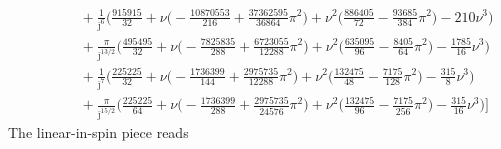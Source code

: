 \documentclass[prd,superscriptaddress,preprintnumbers,tightenlines,nofootinbib, eqsecnum]{revtex4-2}
\newcommand{\nn}{\nonumber}
\begin{document}
\begin{align}
&\qquad\quad + \frac{1}{\bar{\jmath}^{6}}\Bigg(\frac{915915}{32} + \nu\bigg(-\frac{10870553}{216} + \frac{37362595}{36864}\pi^{2}\bigg) + \nu^{2}\bigg(\frac{886405}{72} - \frac{93685}{384}\pi^{2}\bigg) - 210 \nu^{3}\Bigg) \nn \\
&\qquad\quad + \frac{\pi}{\bar{\jmath}^{13/2}}\Bigg(\frac{495495}{32} + \nu\bigg(-\frac{7825835}{288} + \frac{6723055}{12288}\pi^{2}\bigg) + \nu^{2}\bigg(\frac{635095}{96} - \frac{8405}{64}\pi^{2}\bigg) - \frac{1785}{16}\nu^{3}\Bigg) \nn \\
&\qquad\quad + \frac{1}{\bar{\jmath}^{7}}\Bigg(\frac{225225}{32} + \nu\bigg(-\frac{1736399}{144} + \frac{2975735}{12288}\pi^{2}\bigg) + \nu^{2}\bigg(\frac{132475}{48} - \frac{7175}{128}\pi^{2}\bigg) - \frac{315}{8}\nu^{3}\Bigg) \nn \\
&\qquad\quad + \frac{\pi}{\bar{\jmath}^{15/2}}\Bigg(\frac{225225}{64} + \nu\bigg(-\frac{1736399}{288} + \frac{2975735}{24576}\pi^{2}\bigg) + \nu^{2}\bigg(\frac{132475}{96} - \frac{7175}{256}\pi^{2}\bigg) - \frac{315}{16}\nu^{3}\Bigg)\Bigg]
\end{align}
The linear-in-spin piece reads
\end{document}
